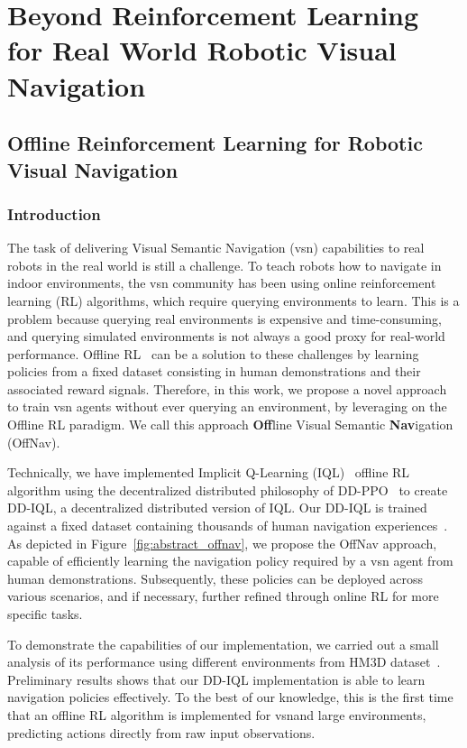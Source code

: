 \chapter{Beyond Reinforcement Learning for Real World Robotic Visual Navigation}\label{ch:rl4rvsn}

\section{Offline Reinforcement Learning for Robotic Visual Navigation}\label{sec:offline_rl4rvsn}

\subsection{Introduction}\label{subsec:introduction_offnav}

The task of delivering Visual Semantic Navigation (\acrshort{vsn}) capabilities to real robots in the real world is still a challenge.
To teach robots how to navigate in indoor environments, the \acrshort{vsn} community has been using online reinforcement learning (RL) algorithms, which require querying environments to learn.
This is a problem because querying real environments is expensive and time-consuming, and querying simulated environments is not always a good proxy for real-world performance.
Offline RL~\cite{levine2020} can be a solution to these challenges by learning policies from a fixed dataset consisting in human demonstrations and their associated reward signals.
Therefore, in this work, we propose a novel approach to train \acrshort{vsn} agents without ever querying an environment, by leveraging on the Offline RL paradigm.
We call this approach \textbf{Off}line Visual Semantic \textbf{Nav}igation (OffNav).

Technically, we have implemented Implicit Q-Learning (IQL)~\cite{kostrikov2022offline} offline RL algorithm using the decentralized distributed philosophy of DD-PPO~\cite{wijmans2020} to create DD-IQL, a decentralized distributed version of IQL\@.
Our DD-IQL is trained against a fixed dataset containing thousands of human navigation experiences~\cite{ramrakhya2023}.
As depicted in Figure~\ref{fig:abstract_offnav}, we propose the OffNav approach, capable of efficiently learning the navigation policy required by a \acrshort{vsn} agent from human demonstrations.
Subsequently, these policies can be deployed across various scenarios, and if necessary, further refined through online RL for more specific tasks.

To demonstrate the capabilities of our implementation, we carried out a small analysis of its performance using different environments from HM3D dataset~\cite{Ramakrishnan2021HabitatMatterport3D}.
Preliminary results shows that our DD-IQL implementation is able to learn navigation policies effectively.
To the best of our knowledge, this is the first time that an offline RL algorithm is implemented for \acrshort{vsn}\@ and large environments, predicting actions directly from raw input observations.

